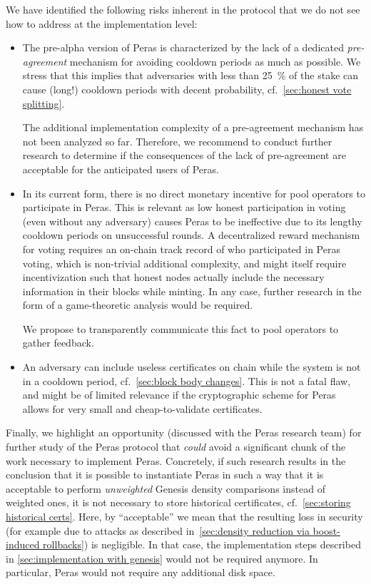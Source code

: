 We have identified the following risks inherent in the protocol that we do not see how to address at the implementation level:
\begin{itemize}
\item
  The pre-alpha version of Peras is characterized by the lack of a dedicated \emph{pre-agreement} mechanism for avoiding cooldown periods as much as possible.
  We stress that this implies that adversaries with less than \qty{25}{\percent} of the stake can cause (long!) cooldown periods with decent probability, cf.~\cref{sec:honest vote splitting}.

  The additional implementation complexity of a pre-agreement mechanism has not been analyzed so far.
  Therefore, we recommend to conduct further research to determine if the consequences of the lack of pre-agreement are acceptable for the anticipated users of Peras.
\item
  In its current form, there is no direct monetary incentive for pool operators to participate in Peras.
  This is relevant as low honest participation in voting (even without any adversary) causes Peras to be ineffective due to its lengthy cooldown periods on unsuccessful rounds.
  A decentralized reward mechanism for voting requires an on-chain track record of who participated in Peras voting, which is non-trivial additional complexity, and might itself require incentivization such that honest nodes actually include the necessary information in their blocks while minting.
  In any case, further research in the form of a game-theoretic analysis would be required.

  We propose to transparently communicate this fact to pool operators to gather feedback.
\item
  An adversary can include useless certificates on chain while the system is not in a cooldown period, cf.~\cref{sec:block body changes}.
  This is not a fatal flaw, and might be of limited relevance if the cryptographic scheme for Peras allows for very small and cheap-to-validate certificates.
\end{itemize}

Finally, we highlight an opportunity (discussed with the Peras research team) for further study of the Peras protocol that \emph{could} avoid a significant chunk of the work necessary to implement Peras.
Concretely, if such research results in the conclusion that it is possible to instantiate Peras in such a way that it is acceptable to perform \emph{unweighted} Genesis density comparisons instead of weighted ones, it is not necessary to store historical certificates, cf.~\cref{sec:storing historical certs}.
Here, by \enquote{acceptable} we mean that the resulting loss in security (for example due to attacks as described in~\cref{sec:density reduction via boost-induced rollbacks}) is negligible.
In that case, the implementation steps described in \cref{sec:implementation with genesis} would not be required anymore.
In particular, Peras would not require any additional disk space.

